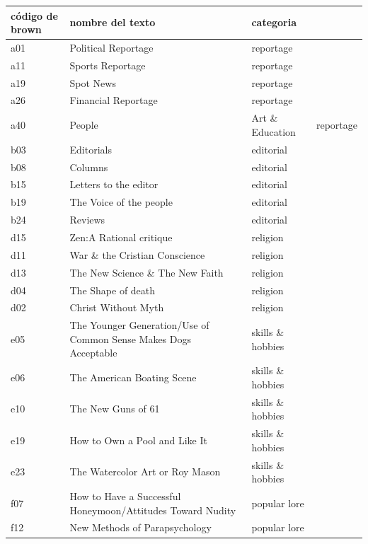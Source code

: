 \documentclass[twoside]{article}
\begin{document}
    \begin{table}[!ht]
    \centering
    \begin{tabular}{|l|l|l|l|}
    \hline
        código de brown & nombre del texto & categoria & ~ \\ \hline
        a01 & Political Reportage & reportage & ~ \\ \hline
        a11 & Sports Reportage & reportage & ~ \\ \hline
        a19 & Spot News & reportage & ~ \\ \hline
        a26 & Financial Reportage & reportage & ~ \\ \hline
        a40 & People & Art \& Education & reportage \\ \hline
        b03 & Editorials & editorial & ~ \\ \hline
        b08 & Columns & editorial & ~ \\ \hline
        b15 & Letters to the editor & editorial & ~ \\ \hline
        b19 & The Voice of the people & editorial & ~ \\ \hline
        b24 & Reviews & editorial & ~ \\ \hline
        d15 & Zen:A Rational critique & religion & ~ \\ \hline
        d11 & War \& the Cristian Conscience & religion & ~ \\ \hline
        d13 & The New Science \& The New Faith & religion & ~ \\ \hline
        d04 & The Shape of death & religion & ~ \\ \hline
        d02 & Christ Without Myth & religion & ~ \\ \hline
        e05 & The Younger Generation/Use of Common Sense Makes Dogs Acceptable & skills \& hobbies & ~ \\ \hline
        e06 & The American Boating Scene & skills \& hobbies & ~ \\ \hline
        e10 & The New Guns of 61 & skills \& hobbies & ~ \\ \hline
        e19 & How to Own a Pool and Like It & skills \& hobbies & ~ \\ \hline
        e23 & The Watercolor Art or Roy Mason & skills \& hobbies & ~ \\ \hline
        f07 & How to Have a Successful Honeymoon/Attitudes Toward Nudity & popular lore & ~ \\ \hline
        f12 & New Methods of Parapsychology & popular lore & ~ \\ \hline

\end{tabular}
\end{table}
\end{document}
